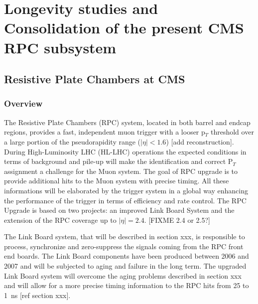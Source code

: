 \renewcommand\evenpagerightmark{{\scshape\small Chapter 5}}
\renewcommand\oddpageleftmark{{\scshape\small Longevity studies and Consolidation of the present \acs{CMS} \acs{RPC} subsystem}}

\renewcommand{\bibname}{References}

\hyphenation{}

\chapter[Longevity studies and Consolidation of the present \acs{CMS} \acs{RPC} subsystem]%
{Longevity studies and Consolidation of the present \acs{CMS} \acs{RPC} subsystem}
\label{chapt5}

\section{Resistive Plate Chambers at CMS}
\label{chapt5:sec:CMS-RPC}

    \subsection{Overview}
    \label{chapt5:ssec:Overview}
    
	The Resistive Plate Chambers (RPC) system, located in both barrel and endcap regions, provides a fast, independent muon trigger with a looser p$_T$ threshold over a large portion of the pseudorapidity range ($|\eta|<1.6$) {\color{blue} [add reconstruction]}.\\
	
	During High-Luminosity LHC (HL-LHC) operations the expected conditions in terms of background and pile-up will make the identification and correct P$_T$ assignment a challenge for the Muon system. The goal of RPC upgrade is to provide additional hits to the Muon system with precise timing. All these informations  will be elaborated by the trigger system  in a global way enhancing the performance of the trigger in terms of efficiency and rate control. The RPC Upgrade is based on two projects: an improved Link Board System and the extension of the RPC coverage up to $|\eta|=2.4$. {\color{blue} [FIXME 2.4 or 2.5?]}

	The Link Board system, that will be described in section xxx, is responsible to process, synchronize and zero-suppress the signals coming from the RPC front end boards. The Link Board components have been produced between 2006 and 2007 and will be subjected to aging and failure in the long term. The upgraded Link Board system will overcome the aging problems described in section xxx and will allow for a more precise timing information to the RPC hits from 25 to \SI{1}{ns} [ref section xxx].


